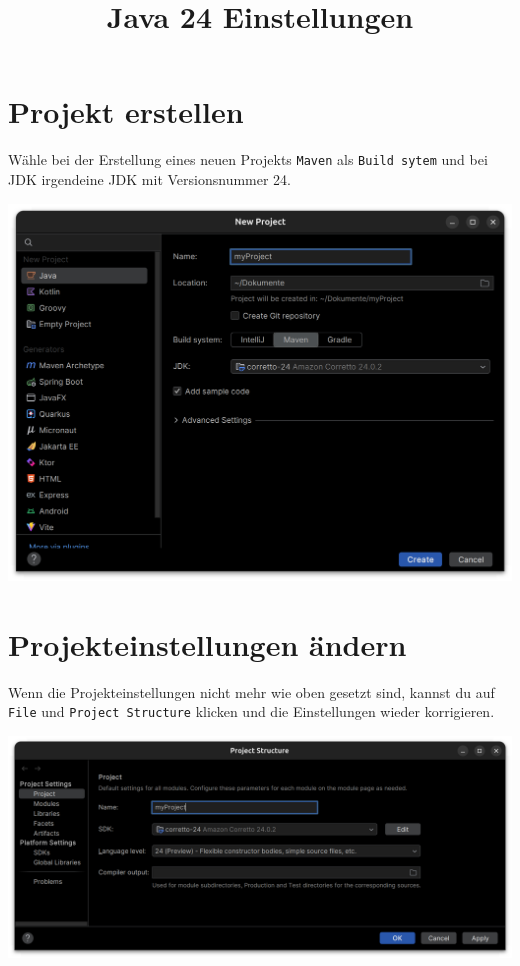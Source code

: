 \documentclass[a4paper]{scrartcl}
\date{}
\title{Java 24 Einstellungen}
\begin{document}
\maketitle



\section{Projekt erstellen}
Wähle bei der Erstellung eines neuen Projekts \texttt{Maven} als \texttt{Build sytem} und bei JDK irgendeine JDK mit Versionsnummer 24.

\includegraphics[width = \linewidth]{create}

\section{Projekteinstellungen ändern}
Wenn die Projekteinstellungen nicht mehr wie oben gesetzt sind, kannst du auf \texttt{File} und \texttt{Project Structure} klicken und die Einstellungen wieder korrigieren.

\includegraphics[width = \linewidth]{change}
\end{document}
